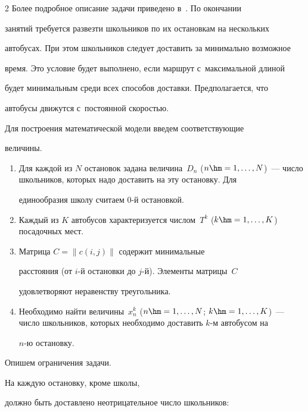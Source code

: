 \begin{multicols}{2}
     Более подробное описание задачи приведено в~\cite{3-va}. По окончании

занятий требуется развезти школьников по их остановкам на нескольких

автобусах. При этом школьников следует доставить за минимально возможное

время. Это условие будет выполнено, если маршрут с~максимальной длиной

будет минимальным среди всех способов доставки. Предполагается, что

автобусы движутся с~постоянной скоростью.



     Для построения математической модели введем соответствующие

величины.

     \begin{enumerate}[1.]

\item Для каждой из $N$ остановок задана величина~$D_n$ ($n\hm=1,\ldots

,N$)~--- число школьников, которых надо доставить на эту остановку. Для

единообразия школу считаем 0-й остановкой.

\item Каждый из $K$ автобусов характеризуется чис\-лом~$T^k$ ($k\hm = 1,\ldots

, K$) посадочных мест.

\item Матрица $C =\parallel c(i, j)\parallel$ содержит минимальные

расстояния (от $i$-й остановки до $j$-й). Элементы матрицы~$C$

удовлетворяют неравенству треугольника.

\item Необходимо найти величины~$x_n^k$ ($n\hm= 1,\ldots, N$; $k\hm=1,\ldots

,K$)~--- число школьников, которых необходимо доставить $k$-м автобусом на

$n$-ю остановку.

\end{enumerate}



     Опишем ограничения задачи.



     На каждую остановку, кроме школы,

должно быть доставлено не\-от\-ри\-ца\-тель\-ное число школьников:


\end{multicols}
